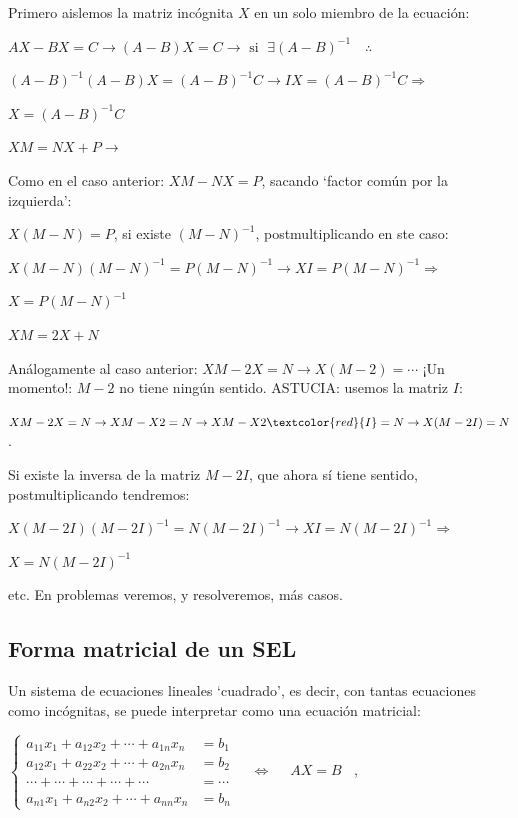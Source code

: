 Primero aislemos la matriz incógnita $X$ en un solo miembro de la ecuación:

$AX-BX=C \to (A-B)X=C \to \text{ si } \; \exists (A-B)^{-1} \quad  \therefore \; $

$(A-B)^{-1}(A-B)X=(A-B)^{-1}C \to IX=(A-B)^{-1}C \Rightarrow $

$X=(A-B)^{-1}C$

\noindent * $XM=NX+P \to$ 

Como en el caso anterior: $XM-NX=P$, sacando `factor común por la izquierda':

$X(M-N)=P$, si existe $(M-N)^{-1}$, postmultiplicando en ste caso:

$X(M-N)(M-N)^{-1}=P(M-N)^{-1} \to XI=P(M-N)^{-1} \Rightarrow $

$X=P(M-N)^{-1}$

\noindent * $XM=2X+N$

Análogamente al caso anterior: $XM-2X=N \to X(M-2)= \cdots $ ¡Un momento!: $M-2$ no tiene ningún sentido. ASTUCIA: usemos la matriz $I$:

\small{$XM-2X=N \to XM-X2=N \to XM-X2\textcolor{red}{I}=N \to X(M-2I)=N$}\normalsize{.}

Si existe la inversa de la matriz $M-2I$, que ahora sí tiene sentido, postmultiplicando tendremos:

$X(M-2I)(M-2I)^{-1}=N(M-2I)^{-1} \to XI=N(M-2I)^{-1} \Rightarrow $

$X=N(M-2I)^{-1}$

\noindent * etc.  En problemas veremos, y resolveremos, más casos.





\subsection{Forma matricial de un SEL}

Un sistema de ecuaciones lineales `cuadrado', es decir, con tantas ecuaciones como incógnitas, se puede interpretar como una ecuación matricial:

$\begin{cases} a_{11}x_1+a_{12}x_2 + \cdots + a_{1n}x_n &=b_1 \\
a_{12}x_1+a_{22}x_2 + \cdots + a_{2n}x_n &=b_2 \\
\cdots + \cdots + \cdots + \cdots + \cdots  &=\cdots \\
a_{n1}x_1+a_{n2}x_2+\cdots +a_{nn}x_n &=b_n  \end{cases} \quad \Leftrightarrow \quad \boxed{\; AX=B\; \; }$	,

